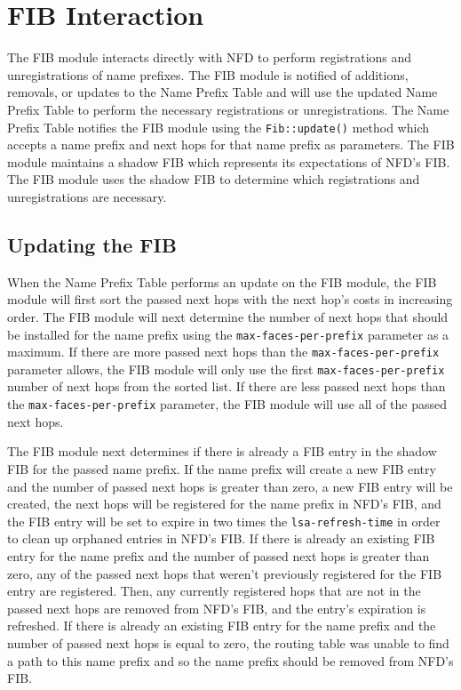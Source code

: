 \section{FIB Interaction}
\label{sec:fib}

The FIB module interacts directly with NFD to perform registrations and unregistrations of name prefixes.
The FIB module is notified of additions, removals, or updates to the Name Prefix Table and will use the updated Name Prefix Table to perform the necessary registrations or unregistrations.
The Name Prefix Table notifies the FIB module using the \texttt{Fib::update()} method which accepts a name prefix and next hops for that name prefix as parameters.
The FIB module maintains a shadow FIB which represents its expectations of NFD's FIB.
The FIB module uses the shadow FIB to determine which registrations and unregistrations are necessary.

\subsection{Updating the FIB}
When the Name Prefix Table performs an update on the FIB module, the FIB module will first sort the passed next hops with the next hop's costs in increasing order.
The FIB module will next determine the number of next hops that should be installed for the name prefix using the \texttt{max-faces-per-prefix} parameter as a maximum.
If there are more passed next hops than the \texttt{max-faces-per-prefix} parameter allows, the FIB module will only use the first \texttt{max-faces-per-prefix} number of next hops from the sorted list.
If there are less passed next hops than the \texttt{max-faces-per-prefix} parameter, the FIB module will use all of the passed next hops.

The FIB module next determines if there is already a FIB entry in the shadow FIB for the passed name prefix.
If the name prefix will create a new FIB entry and the number of passed next hops is greater than zero, a new FIB entry will be created,
the next hops will be registered for the name prefix in NFD's FIB, and the FIB entry will be set to expire in two times the \texttt{lsa-refresh-time} in order to clean up orphaned entries in NFD's FIB.
If there is already an existing FIB entry for the name prefix and the number of passed next hops is greater than zero, any of the passed next hops that weren't previously registered for the FIB entry are registered.
Then, any currently registered hops that are not in the passed next hops are removed from NFD's FIB, and the entry's expiration is refreshed.
If there is already an existing FIB entry for the name prefix and the number of passed next hops is equal to zero, the routing table was unable to find a path to this name prefix and so the name prefix should be removed from NFD's FIB.
